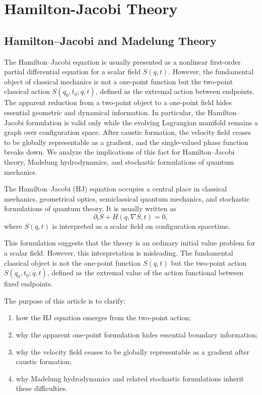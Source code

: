 \chapter{Hamilton-Jacobi Theory}
\label{hj}

\section{Hamilton--Jacobi and Madelung Theory}

The Hamilton--Jacobi equation is usually presented as a
nonlinear first-order partial differential equation for a scalar field
$S(q,t)$. However, the fundamental object of classical mechanics is not a
one-point function but the two-point classical action $S(q_0,t_0;q,t)$, defined
as the extremal action between endpoints. The apparent reduction from a
two-point object to a one-point field hides essential geometric and dynamical
information. In particular, the Hamilton--Jacobi formulation is valid only
while the evolving Lagrangian manifold remains a graph over configuration
space. After caustic formation, the velocity field ceases to be globally
representable as a gradient, and the single-valued phase function breaks down.
We analyze the implications of this fact for Hamilton--Jacobi theory, Madelung
hydrodynamics, and stochastic formulations of quantum mechanics.

The Hamilton--Jacobi (HJ) equation occupies a central place in classical
mechanics, geometrical optics, semiclassical quantum mechanics, and stochastic
formulations of quantum theory. It is usually written as
\begin{equation}
\partial_t S + H(q,\nabla S,t)=0,
\label{HJ}
\end{equation}
where $S(q,t)$ is interpreted as a scalar field on configuration spacetime.

This formulation suggests that the theory is an ordinary initial value problem
for a scalar field. However, this interpretation is misleading. The fundamental
classical object is not the one-point function $S(q,t)$ but the two-point
action $S(q_0,t_0;q,t)$, defined as the extremal value of the action functional
between fixed endpoints.

The purpose of this article is to clarify:
\begin{enumerate}
\item how the HJ equation emerges from the two-point action;
\item why the apparent one-point formulation hides essential boundary
    information;
\item why the velocity field ceases to be globally representable as a gradient
    after caustic formation;
\item why Madelung hydrodynamics and related stochastic formulations inherit
    these difficulties.
\end{enumerate}

